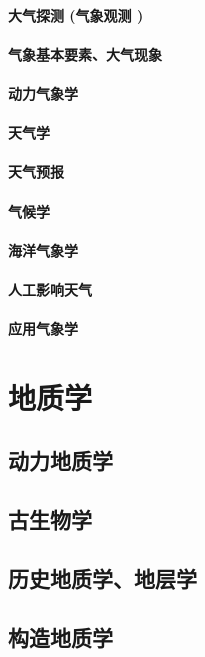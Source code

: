 \documentclass[UTF8]{../NatureUniverse}
\begin{document}
\subsubsection{大气探测 (气象观测 )}
\subsubsection{气象基本要素、大气现象}
\subsubsection{动力气象学}
\subsubsection{天气学}
\subsubsection{天气预报}
\subsubsection{气候学}
\subsubsection{海洋气象学}
\subsubsection{人工影响天气}
\subsubsection{应用气象学}






\chapter{地质学}
\section{动力地质学}
\section{古生物学}
\section{历史地质学、地层学}
\section{构造地质学}
\end{document}
